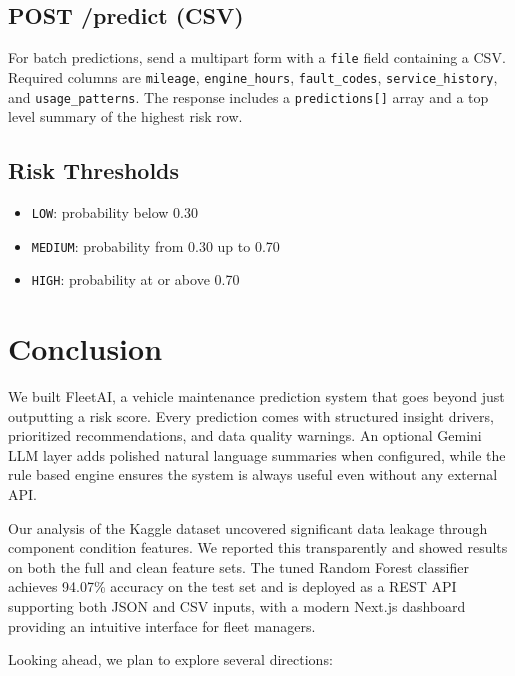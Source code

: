 \documentclass[conference]{IEEEtran}
\begin{document}
\subsection{POST /predict (CSV)}
For batch predictions, send a multipart form with a \texttt{file} field containing a CSV. Required columns are \texttt{mileage}, \texttt{engine\_hours}, \texttt{fault\_codes}, \texttt{service\_history}, and \texttt{usage\_patterns}. The response includes a \texttt{predictions[]} array and a top level summary of the highest risk row.

\subsection{Risk Thresholds}
\begin{itemize}
    \item \texttt{LOW}: probability below 0.30
    \item \texttt{MEDIUM}: probability from 0.30 up to 0.70
    \item \texttt{HIGH}: probability at or above 0.70
\end{itemize}

\section{Conclusion}

We built FleetAI, a vehicle maintenance prediction system that goes beyond just outputting a risk score. Every prediction comes with structured insight drivers, prioritized recommendations, and data quality warnings. An optional Gemini LLM layer adds polished natural language summaries when configured, while the rule based engine ensures the system is always useful even without any external API.

Our analysis of the Kaggle dataset uncovered significant data leakage through component condition features. We reported this transparently and showed results on both the full and clean feature sets. The tuned Random Forest classifier achieves 94.07\% accuracy on the test set and is deployed as a REST API supporting both JSON and CSV inputs, with a modern Next.js dashboard providing an intuitive interface for fleet managers.

Looking ahead, we plan to explore several directions:
\end{document}
